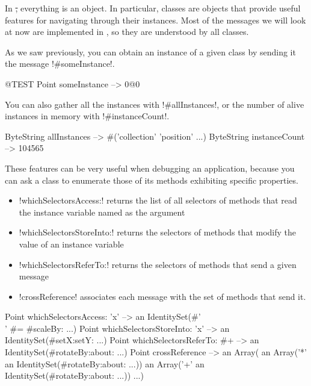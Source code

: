 \documentclass[a4paper,10pt,twoside]{book}
\begin{document}
In \st, everything is an object. In particular, classes are objects that provide useful features for navigating through their instances.
Most of the messages we will look at now are implemented in , so they are understood by all classes.

As we saw previously, you can obtain an instance of a given class by sending it the message \ct!#someInstance!.

\begin{code}{@TEST} %
Point someInstance --> 0@0
\end{code}

You can also gather all the instances with \ct!#allInstances!, or the number of alive instances in memory with \ct!#instanceCount!. 

\begin{code}{} %
ByteString allInstances     --> #('collection' 'position'  ...)
ByteString instanceCount --> 104565
\end{code}

These features can be very useful when debugging an application, because you can ask a class to enumerate those of its methods exhibiting specific properties.
\begin{itemize}
\item \ct!whichSelectorsAccess:! returns the list of all selectors of methods that read the instance variable named as the argument 
\item \ct!whichSelectorsStoreInto:! returns the selectors of methods that modify the value of an instance variable
\item \ct!whichSelectorsReferTo:! returns the selectors of methods that send a given message
\item \ct!crossReference! associates each message with the set of methods that send it.
\end{itemize}

\begin{code}{} %
Point whichSelectorsAccess: 'x'    --> an IdentitySet(#'\\' #= #scaleBy: ...)
Point whichSelectorsStoreInto: 'x' --> an IdentitySet(#setX:setY: ...)
Point whichSelectorsReferTo: #+  --> an IdentitySet(#rotateBy:about: ...)
Point crossReference --> an Array(
		an Array('*' an IdentitySet(#rotateBy:about: ...))
		an Array('+' an IdentitySet(#rotateBy:about: ...))
		...)
\end{code}
\end{document}
